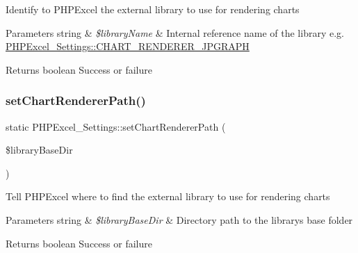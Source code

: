 Identify to P\+H\+P\+Excel the external library to use for rendering charts


\begin{DoxyParams}[1]{Parameters}
string & {\em \$library\+Name} & Internal reference name of the library e.\+g. \hyperlink{classPHPExcel__Settings_ae4c1909d1fd2ef156cc33144a463e4a2}{P\+H\+P\+Excel\+\_\+\+Settings\+::\+C\+H\+A\+R\+T\+\_\+\+R\+E\+N\+D\+E\+R\+E\+R\+\_\+\+J\+P\+G\+R\+A\+PH}\\
\hline
\end{DoxyParams}
\begin{DoxyReturn}{Returns}
boolean Success or failure 
\end{DoxyReturn}
\mbox{\label{classPHPExcel__Settings_a1eb3096fe1afed3fadb6575e077e0975}} 
\subsubsection{\texorpdfstring{set\+Chart\+Renderer\+Path()}{setChartRendererPath()}}
{\footnotesize\ttfamily static P\+H\+P\+Excel\+\_\+\+Settings\+::set\+Chart\+Renderer\+Path (\begin{DoxyParamCaption}\item[{}]{\$library\+Base\+Dir }\end{DoxyParamCaption})\hspace{0.3cm}{\ttfamily [static]}}

Tell P\+H\+P\+Excel where to find the external library to use for rendering charts


\begin{DoxyParams}[1]{Parameters}
string & {\em \$library\+Base\+Dir} & Directory path to the library\textquotesingle{}s base folder \\
\hline
\end{DoxyParams}
\begin{DoxyReturn}{Returns}
boolean Success or failure 
\end{DoxyReturn}
\mbox{\label{classPHPExcel__Settings_af7c63bca5c79932a4a046d2030a258d2}} 
